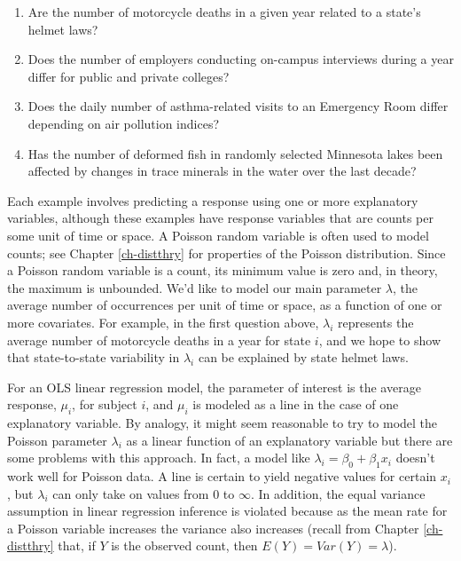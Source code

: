 \documentclass[
]{krantz}
\providecommand{\tightlist}{%
  \setlength{\itemsep}{0pt}\setlength{\parskip}{0pt}}
\begin{document}
\begin{enumerate}
\def\labelenumi{\arabic{enumi}.}
\tightlist
\item
  Are the number of motorcycle deaths in a given year related to a state's helmet laws?
\item
  Does the number of employers conducting on-campus interviews during a year differ for public and private colleges?
\item
  Does the daily number of asthma-related visits to an Emergency Room differ depending on air pollution indices?
\item
  Has the number of deformed fish in randomly selected Minnesota lakes been affected by changes in trace minerals in the water over the last decade?
\end{enumerate}

Each example involves predicting a response using one or more explanatory variables, although these examples have response variables that are counts per some unit of time or space. A Poisson random variable is often used to model counts; see Chapter \ref{ch-distthry} for properties of the Poisson distribution. Since a Poisson random variable is a count, its minimum value is zero and, in theory, the maximum is unbounded. We'd like to model our main parameter \(\lambda\), the average number of occurrences per unit of time or space, as a function of one or more covariates. For example, in the first question above, \(\lambda_i\) represents the average number of motorcycle deaths in a year for state \(i\), and we hope to show that state-to-state variability in \(\lambda_i\) can be explained by state helmet laws.

For an OLS linear regression model, the parameter of interest is the average response, \(\mu_i\), for subject \(i\), and \(\mu_i\) is modeled as a line in the case of one explanatory variable. By analogy, it might seem reasonable to try to model the Poisson parameter \(\lambda_i\) as a linear function of an explanatory variable but there are some problems with this approach. In fact, a model like \(\lambda_i=\beta_0+\beta_1x_i\) doesn't work well for Poisson data. A line is certain to yield negative values for certain \(x_i\), but \(\lambda_i\) can only take on values from 0 to \(\infty\). In addition, the equal variance assumption in linear regression inference is violated because as the mean rate for a Poisson variable increases the variance also increases (recall from Chapter \ref{ch-distthry} that, if \(Y\) is the observed count, then \(E(Y)=Var(Y)=\lambda\)).
\end{document}
